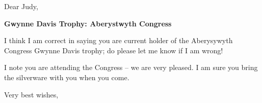 \documentclass[12pt]{letter}
\begin{document}
\begin{letter}{}
\opening{Dear Judy,}

{\bf Gwynne Davis Trophy: Aberystwyth Congress}

I think I am correct in saying you are current holder of the
Aberysywyth Congress Gwynne Davis trophy; do please let me know if I am
wrong!

I note you are attending the Congress -- we are very pleased.  I am
sure you bring the silverware with you when you come.

\closing{Very best wishes,}

\end{letter}
\end{document}
